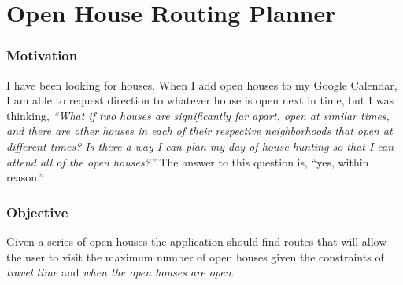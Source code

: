 \documentclass[letterpaper,11pt]{report}
\theoremstyle{definition}
\theoremstyle{definition}
\begin{document}
\normalem       %


%
%

%
%

%
%

%
%

%
%

%
%

%
%

%
%


\chapter{Open House Routing Planner}
\subsection{Motivation}
I have been looking for houses. When I add open houses to my Google Calendar, I am able to request direction to whatever house is open next in time, but I was thinking, \emph{``What if two houses are significantly far apart, open at similar times, and there are other houses in each of their respective neighborhoods that open at different times? Is there a way I can plan my day of house hunting so that I can attend all of the open houses?''} The answer to this question is, ``yes, within reason.''

\subsection{Objective}
Given a series of open houses the application should find routes that will allow the user to visit the maximum number of open houses given the constraints of \emph{travel time} and \emph{when the open houses are open}.
\end{document}
